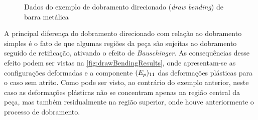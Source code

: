 \documentclass[Tese.tex]{subfiles}
\begin{document}
\begin{figure}[!htb]
	\centering
	\caption{Dados do exemplo de dobramento direcionado (\emph{draw bending}) de barra metálica}
	\label{fig:drawBending}
	{\small
		\noindent{}
	}	
\end{figure}


A principal diferença do dobramento direcionado com relação ao dobramento simples é o fato de que algumas regiões da peça são sujeitas ao dobramento seguido de retificação, ativando o efeito de \emph{Bauschinger}. As consequências desse efeito podem ser vistas na \autoref{fig:drawBendingResults}, onde apresentam-se as configurações deformadas e a componente $({E}_p)_{11}$ das deformações plásticas para o caso sem atrito. Como pode ser visto, ao contrário do exemplo anterior, neste caso as deformações plásticas não se concentram apenas na região central da peça, mas também residualmente na região superior, onde houve anteriormente o processo de dobramento.
\end{document}
